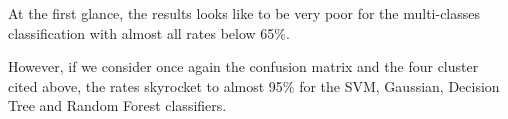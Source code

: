             
            \medskip
            
            At the first glance, the results looks like to be very poor for the multi-classes classification with almost all 
            rates below 65\%. 
            
            \medskip
            
            However, if we consider once again the confusion matrix and the four cluster cited above, the rates skyrocket to almost 
            95\% for the SVM, Gaussian, Decision Tree and Random Forest classifiers.

            